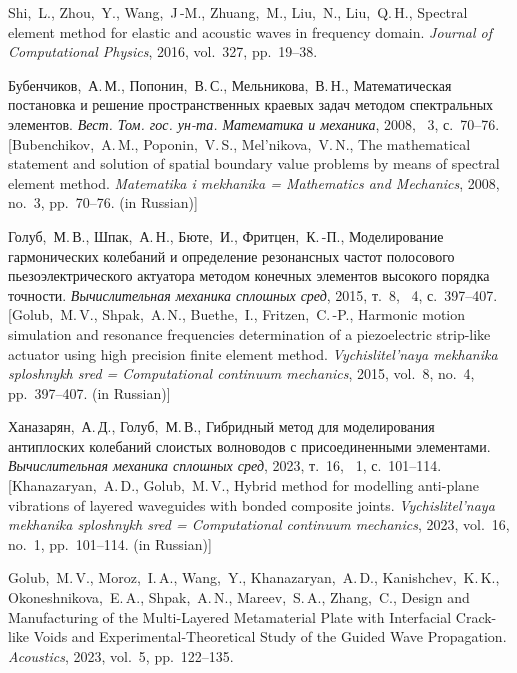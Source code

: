 \documentclass[press]{vestnik}
\begin{document}
\begin{thebibliography}{23}
Shi,~L., Zhou,~Y., Wang,~J\,-M., Zhuang,~M., Liu,~N., Liu,~Q.\,H., Spectral element method for elastic and acoustic waves in frequency domain. \emph{Journal of Computational Physics}, 2016, vol.~327, pp.~19--38. 

Бубенчиков,~А.\,М., Попонин,~В.\,С., Мельникова,~В.\,Н., Математическая постановка и решение пространственных краевых задач методом спектральных элементов. \emph{Вест. Том. гос. ун-та. Математика и механика}, 2008, \No~3, с.~70--76. [Bubenchikov,~A.\,M., Poponin,~V.\,S., Mel’nikova,~V.\,N., The mathematical statement and solution of spatial boundary value problems by means of spectral element method. \emph{Matematika i mekhanika = Mathematics and Mechanics}, 2008, no.~3, pp.~70--76. (in Russian)] 

Голуб,~М.\,В., Шпак,~А.\,Н., Бюте,~И., Фритцен,~К.\,-П., Моделирование гармонических колебаний и определение резонансных частот полосового пьезоэлектрического актуатора методом конечных элементов высокого порядка точности. \emph{Вычислительная механика сплошных сред}, 2015, т.~8, \No~4, с.~397--407. [Golub,~M.\,V., Shpak,~A.\,N., Buethe,~I., Fritzen,~C.\,-P., Harmonic motion simulation and resonance frequencies determination of a piezoelectric strip-like actuator using high precision finite element method. \emph{Vychislitel'naya mekhanika sploshnykh sred = Computational continuum mechanics}, 2015, vol.~8, no.~4, pp.~397--407. (in Russian)] 

Ханазарян,~А.\,Д., Голуб,~М.\,В., Гибридный метод для моделирования антиплоских колебаний слоистых волноводов с присоединенными элементами. \emph{Вычислительная механика сплошных сред}, 2023, т.~16, \No~1, с.~101--114. [Khanazaryan,~A.\,D., Golub,~M.\,V., Hybrid method for modelling anti-plane vibrations of layered waveguides with bonded composite joints. \emph{Vychislitel'naya mekhanika sploshnykh sred = Computational continuum mechanics}, 2023, vol.~16, no.~1, pp.~101--114. (in Russian)] 

Golub,~M.\,V., Moroz,~I.\,A., Wang,~Y., Khanazaryan,~A.\,D., Kanishchev,~K.\,K., Okoneshnikova,~E.\,A., Shpak,~A.\,N., Mareev,~S.\,A., Zhang,~C., Design and Manufacturing of the Multi-Layered Metamaterial Plate with Interfacial Crack-like Voids and Experimental-Theoretical Study of the Guided Wave Propagation. \emph{Acoustics}, 2023, vol.~5, pp.~122--135. 

\end{thebibliography}
\end{document}
